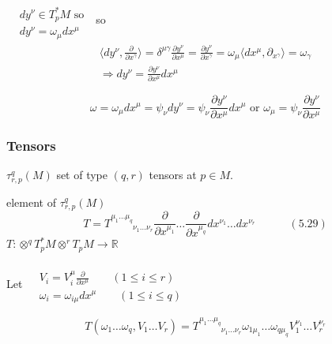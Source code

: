 \documentclass[twoside]{amsart}
\begin{document}
$\begin{aligned}
  & \quad \\
  & dy^{\nu} \in T_p^*M \text{ so } \\
  & dy^{\nu} = \omega_{\mu} dx^{\mu} \end{aligned}$ so
\[
\begin{gathered}
\langle dy^{\nu} , \frac{ \partial }{ \partial x^{\gamma} } \rangle = \delta^{\mu \gamma} \frac{ \partial y^{\nu} }{ \partial x^{\mu} } = \frac{ \partial y^{\nu} }{ \partial x^{\gamma} } = \omega_{\mu} \langle dx^{\mu}, \partial_{x^{\gamma}} \rangle = \omega_{\gamma} \\
\Longrightarrow dy^{\nu} = \frac{ \partial y^{\nu} }{ \partial x^{\mu} } dx^{\mu} 
\end{gathered}
\]

\[
\omega = \omega_{\mu} dx^{\mu} = \psi_{\nu} dy^{\nu} = \psi_{\nu} \frac{ \partial y^{\nu}}{ \partial x^{\mu}  } dx^{\mu} \text{ or } \omega_{\mu} = \psi_{\nu} \frac{ \partial y^{\nu }}{ \partial x^{\mu}}
\]


\subsubsection{Tensors}

$\tau^q_{r, p }(M)$ set of type $(q,r)$ tensors at $p\in M$.  

element of $\tau^q_{r, p }(M)$
\[
T = T^{\mu_1 \dots \mu_q }_{\phantom{\mu_1 \dots \mu_q} \nu_1 \dots \nu_r } \frac{ \partial }{ \partial x^{\mu_1} } \dots \frac{ \partial}{ \partial x^{\mu_q} } dx^{\nu_1 } \dots dx^{\nu_r} \quad \quad \quad (5.29)
\]
$T: \otimes^q T_p^*M \otimes^r T_pM \to \mathbb{R}$

Let $\begin{aligned} & \quad \\ 
  & V_i = V_i^{\mu} \frac{ \partial }{ \partial x^{\mu }} \quad \quad ( 1 \leq i \leq r) \\ 
  & \omega_i = \omega_{i \mu} dx^{\mu} \quad \quad ( 1 \leq i \leq q ) \end{aligned}$

\[
T(\omega_1 \dots \omega_q, V_1 \dots V_r) = T^{\mu_1 \dots \mu_q }_{\phantom{\mu_1 \dots \mu_q} \nu_1 \dots \nu_r } \omega_{1 \mu_1} \dots \omega_{q \mu_q} V_1^{\nu_1} \dots V_r^{\nu_r}
\]

\end{document}

